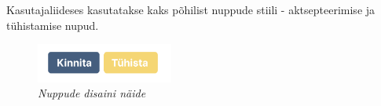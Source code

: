 Kasutajaliideses kasutatakse kaks põhilist nuppude stiili - aktsepteerimise ja tühistamise nupud.
\begin{figure}[ht]
    \centering
    \includegraphics[width=0.4\textwidth]{figures/analysis/desing_buttons.png}
    \caption[Nuppude disaini näide]{\textit{Nuppude disaini näide}}
    \label{fig:design_buttons}
\end{figure}





